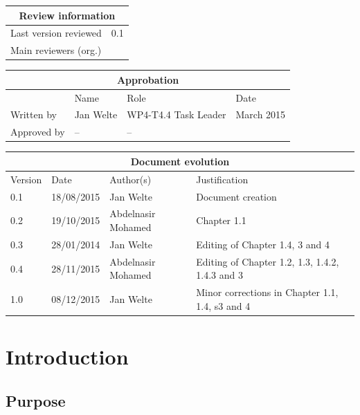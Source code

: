 \begin{tabular}{|p{4.4cm}|p{8.7cm}|}
\hline
\multicolumn{2}{|c|}{Review information} \\
\hline
Last version reviewed & 0.1 \\
\hline
Main reviewers (org.) & \\
\hline
\end{tabular}

\begin{tabular}{|p{2.2cm}|p{4cm}|p{4cm}|p{2cm}|}
\hline
\multicolumn{4}{|c|}{Approbation} \\
\hline
  &  Name & Role & Date   \\
\hline  
Written by    &  Jan Welte & WP4-T4.4 Task Leader  &  March 2015\\
\hline
Approved by & -- & -- & \\
\hline
\end{tabular}

\begin{tabular}{|p{2.2cm}|p{2cm}|p{4cm}|p{4cm}|}
\hline
\multicolumn{4}{|c|}{Document evolution} \\
\hline
Version &  Date & Author(s) & Justification  \\
\hline
0.1 & 18/08/2015 & Jan Welte &  Document creation \\
\hline 
0.2 & 19/10/2015 & Abdelnasir Mohamed & Chapter 1.1 \\
\hline  
0.3 & 28/01/2014 & Jan Welte & Editing of Chapter 1.4, 3 and 4  \\
\hline  
0.4 & 28/11/2015 & Abdelnasir Mohamed & Editing of Chapter 1.2, 1.3, 1.4.2, 1.4.3 and 3\\
\hline
1.0 & 08/12/2015 & Jan Welte & Minor corrections in Chapter 1.1, 1.4, s3 and 4 \\
\hline
\end{tabular}
\newpage


\mainmatter

\chapter{Introduction}
\label{sec:introduction}
 
\section{Purpose}
\label{sec:purpose}


